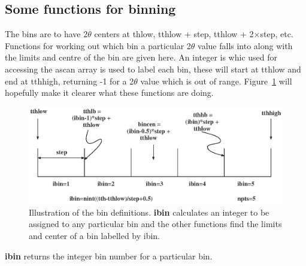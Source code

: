 \documentclass[10pt,a4paper,notitlepage]{article}
\newcommand{\code}[1]{\textbf{\textsf{#1}}} %
\begin{document}
\subsection{Some functions for binning}
The bins are to have 2$\theta$ centers at thlow, tthlow + step, 
tthlow + 2$\times$step, etc.
Functions for working out which bin a particular 2$\theta$ value falls into 
along with the limits and centre of the bin are given here. 
An integer is whic used for accessing the ascan array is used to label
each bin, 
these will start at tthlow and end at tthhigh, returning
-1 for a 2$\theta$ value which is out of range. 
Figure~\ref{fig:bindef} will
hopefully make it clearer what these functions are doing.

\begin{figure}[tb]
  \centering
  \includegraphics{bindef.eps}
  \caption{Illustration of the bin definitions. \code{ibin} calculates an
  integer to be assigned to any particular bin and the other functions 
  find the limits and center of a bin labelled by ibin.}
  \label{fig:bindef}
\end{figure}

\code{ibin} returns the integer bin number for a particular bin.
\end{document}
